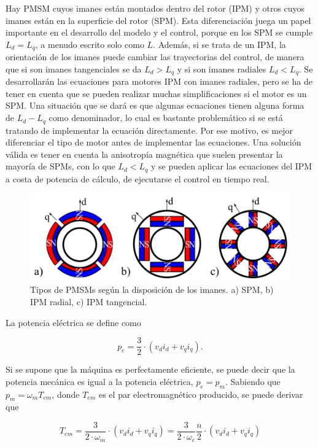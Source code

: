 Hay PMSM cuyos imanes están montados dentro del rotor (IPM) y otros cuyos imanes están en la superficie del rotor (SPM). Esta diferenciación juega un papel importante en el desarrollo del modelo y el control, porque en los SPM se cumple \(L_d = L_q\), a menudo escrito solo como \(L\). Además, si se trata de un IPM, la orientación de los imanes puede cambiar las trayectorias del control, de manera que si son imanes tangenciales se da \(L_d > L_q\) y si son imanes radiales \(L_d < L_q\). Se desarrollarán las ecuaciones para motores IPM con imanes radiales, pero se ha de tener en cuenta que se pueden realizar muchas simplificaciones si el motor es un SPM. Una situación que se dará es que algunas ecuaciones tienen alguna forma de \(L_d - L_q\) como denominador, lo cual es bastante problemático si se está tratando de implementar la ecuación directamente. Por ese motivo, es mejor diferenciar el tipo de motor antes de implementar las ecuaciones. Una solución válida es tener en cuenta la anisotropía magnética que suelen presentar la mayoría de SPMs, con lo que \(L_d < L_q\) y se pueden aplicar las ecuaciones del IPM a costa de potencia de cálculo, de ejecutarse el control en tiempo real.

\begin{figure}[H]
	\centering
	\includegraphics[width=0.7\linewidth]{fig/motor-types}
	\caption{Tipos de PMSMs según la disposición de los imanes. a) SPM, b) IPM radial, c) IPM tangencial.}
\end{figure}


La potencia eléctrica se define como

\begin{equation}
p_e = \frac{3}{2}\cdot(v_d i_d + v_q i_q) \text{.}
\end{equation}

Si se supone que la máquina es perfectamente eficiente, se puede decir que la potencia mecánica es igual a la potencia eléctrica, \(p_e = p_m\). Sabiendo que \(p_m = \omega_m T_{em}\), donde \(T_{em}\) es el par electromagnético producido, se puede derivar que

\begin{equation}
T_{em} = \frac{3}{2\cdot \omega_m}\cdot(v_d i_d + v_q i_q) = \frac{3}{2\cdot \omega_e}\frac{n}{2}\cdot(v_d i_d + v_q i_q)
\end{equation}

